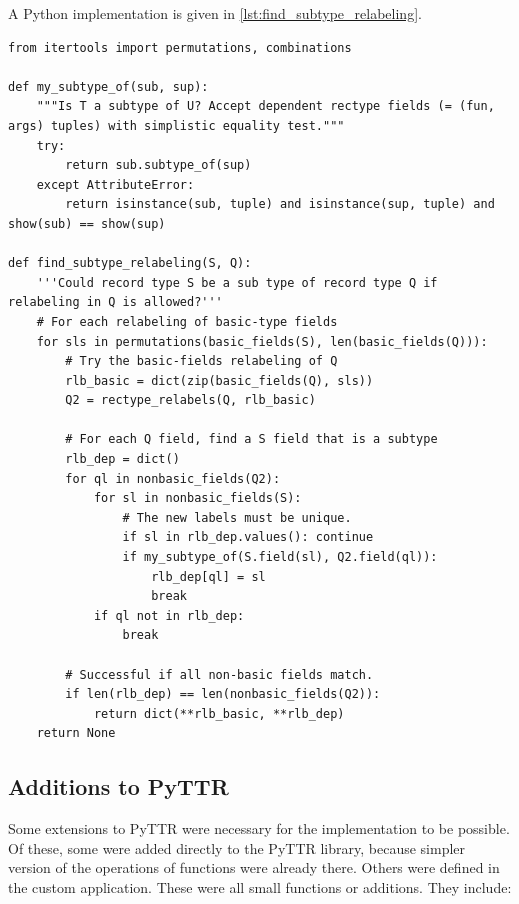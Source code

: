 A Python implementation is given in \autoref{lst:find_subtype_relabeling}.

\begin{lstlisting}[label={lst:find_subtype_relabeling}, caption=The \texttt{find\_subtype\_relabeling} function]
from itertools import permutations, combinations

def my_subtype_of(sub, sup):
    """Is T a subtype of U? Accept dependent rectype fields (= (fun, args) tuples) with simplistic equality test."""
    try:
        return sub.subtype_of(sup)
    except AttributeError:
        return isinstance(sub, tuple) and isinstance(sup, tuple) and show(sub) == show(sup)

def find_subtype_relabeling(S, Q):
    '''Could record type S be a sub type of record type Q if relabeling in Q is allowed?'''
    # For each relabeling of basic-type fields
    for sls in permutations(basic_fields(S), len(basic_fields(Q))):
        # Try the basic-fields relabeling of Q
        rlb_basic = dict(zip(basic_fields(Q), sls))
        Q2 = rectype_relabels(Q, rlb_basic)
        
        # For each Q field, find a S field that is a subtype
        rlb_dep = dict()
        for ql in nonbasic_fields(Q2):
            for sl in nonbasic_fields(S):
                # The new labels must be unique.
                if sl in rlb_dep.values(): continue
                if my_subtype_of(S.field(sl), Q2.field(ql)):
                    rlb_dep[ql] = sl
                    break
            if ql not in rlb_dep:
                break

        # Successful if all non-basic fields match.
        if len(rlb_dep) == len(nonbasic_fields(Q2)):
            return dict(**rlb_basic, **rlb_dep)
    return None
\end{lstlisting}



\subsection{Additions to PyTTR}

Some extensions to PyTTR were necessary for the implementation to be possible.
Of these, some were added directly to the PyTTR library, because simpler version of the operations of functions were already there.
Others were defined in the custom application.
These were all small functions or additions.
They include:

